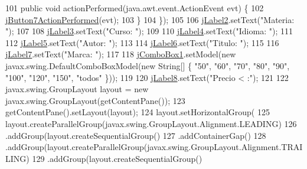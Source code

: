 \begin{DoxyCode}
101             \textcolor{keyword}{public} \textcolor{keywordtype}{void} actionPerformed(java.awt.event.ActionEvent evt) \{
102                 \mbox{\hyperlink{class_interfaz_package_1_1_consulta_busqueda_a390264bada5866106e6de1fc262ca5b7}{jButton7ActionPerformed}}(evt);
103             \}
104         \});
105 
106         \mbox{\hyperlink{class_interfaz_package_1_1_consulta_busqueda_a875cc70442f93c7e077251d0fb0f30f9}{jLabel2}}.setText(\textcolor{stringliteral}{"Materia: "});
107 
108         \mbox{\hyperlink{class_interfaz_package_1_1_consulta_busqueda_ac2ce384e0d5b1405b8a3cfec2683a020}{jLabel3}}.setText(\textcolor{stringliteral}{"Curso: "});
109 
110         \mbox{\hyperlink{class_interfaz_package_1_1_consulta_busqueda_a2b841f08ba3d614049012b4b67130909}{jLabel4}}.setText(\textcolor{stringliteral}{"Idioma: "});
111 
112         \mbox{\hyperlink{class_interfaz_package_1_1_consulta_busqueda_aa93cd22be90131fea76b2a1b2f113b9b}{jLabel5}}.setText(\textcolor{stringliteral}{"Autor: "});
113 
114         \mbox{\hyperlink{class_interfaz_package_1_1_consulta_busqueda_ab5f2ed2b4cd6da7ed4e68ab08caabf65}{jLabel6}}.setText(\textcolor{stringliteral}{"Titulo: "});
115 
116         \mbox{\hyperlink{class_interfaz_package_1_1_consulta_busqueda_a999fbcac6f0a6a7bfc57c17612ea2605}{jLabel7}}.setText(\textcolor{stringliteral}{"Marca: "});
117 
118         \mbox{\hyperlink{class_interfaz_package_1_1_consulta_busqueda_ab0737507a855f158ca16439d3df67b4e}{jComboBox1}}.setModel(\textcolor{keyword}{new} javax.swing.DefaultComboBoxModel(\textcolor{keyword}{new} String[] \{ \textcolor{stringliteral}{"50"}, \textcolor{stringliteral}{"60"}, \textcolor{stringliteral}{"70"},
       \textcolor{stringliteral}{"80"}, \textcolor{stringliteral}{"90"}, \textcolor{stringliteral}{"100"}, \textcolor{stringliteral}{"120"}, \textcolor{stringliteral}{"150"}, \textcolor{stringliteral}{"todos"} \}));
119 
120         \mbox{\hyperlink{class_interfaz_package_1_1_consulta_busqueda_ade14e21c50a0fe22a685656e3815a253}{jLabel8}}.setText(\textcolor{stringliteral}{"Precio < :"});
121 
122         javax.swing.GroupLayout layout = \textcolor{keyword}{new} javax.swing.GroupLayout(getContentPane());
123         getContentPane().setLayout(layout);
124         layout.setHorizontalGroup(
125             layout.createParallelGroup(javax.swing.GroupLayout.Alignment.LEADING)
126             .addGroup(layout.createSequentialGroup()
127                 .addContainerGap()
128                 .addGroup(layout.createParallelGroup(javax.swing.GroupLayout.Alignment.TRAILING)
129                     .addGroup(layout.createSequentialGroup()

\end{DoxyCode}
